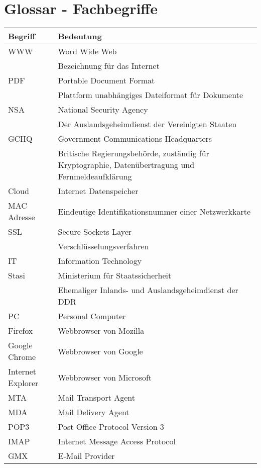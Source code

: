 \section{Glossar - Fachbegriffe}

\begin{tabular*}{\textwidth}{|p{}|p{}|}
  \hline
  \cellcolor{gray}Begriff & \cellcolor{gray}Bedeutung \\ \hline
  WWW & Word Wide Web \\
      & Bezeichnung für das Internet \\ \hline
  PDF & Portable Document Format \\
      & Plattform unabhängiges Dateiformat für Dokumente \\ \hline
  NSA & National Security Agency \\
      & Der Auslandsgeheimdienst der Vereinigten Staaten \\ \hline
  GCHQ & Government Communications Headquarters \\
       & Britische Regierungsbehörde, zuständig für Kryptographie, Datenübertragung und Fernmeldeaufklärung \\ \hline
  Cloud & Internet Datenspeicher \\ \hline
  MAC Adresse & Eindeutige Identifikationsnummer einer Netzwerkkarte \\ \hline
  SSL & Secure Sockets Layer \\
      & Verschlüsselungsverfahren \\ \hline
  IT & Information Technology \\ \hline
  Stasi & Ministerium für Staatssicherheit \\
        & Ehemaliger Inlands- und Auslandsgeheimdienst der DDR \\ \hline
  PC & Personal Computer \\ \hline
  Firefox & Webbrowser von Mozilla \\ \hline
  Google Chrome & Webbrowser von Google \\ \hline
  Internet Explorer & Webbrowser von Microsoft \\ \hline
  MTA & Mail Transport Agent \\ \hline
  MDA & Mail Delivery Agent \\ \hline
  POP3 & Post Office Protocol Version 3 \\ \hline
  IMAP & Internet Message Access Protocol \\ \hline
  GMX & E-Mail Provider \\ \hline

\end{tabular*}
